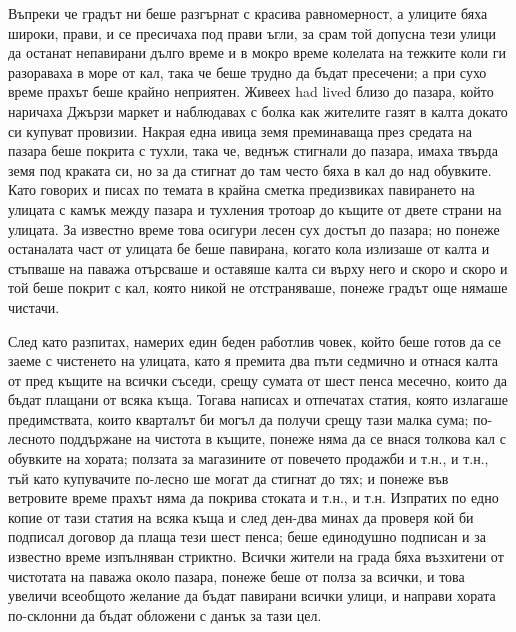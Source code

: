 \documentclass[12pt]{book}
\begin{document}
Въпреки че градът ни беше разгърнат с красива равномерност, а улиците бяха широки, прави, и се пресичаха под прави ъгли, за срам той допусна тези улици да останат непавирани дълго време и в мокро време колелата на тежките коли ги разораваха в море от кал, така че беше трудно да бъдат пресечени; а при сухо време прахът беше крайно неприятен. Живеех had lived близо до пазара, който наричаха Джързи маркет и наблюдавах с болка как жителите газят в калта докато си купуват провизии. Накрая една ивица земя преминаваща през средата на пазара беше покрита с тухли, така че, веднъж стигнали до пазара, имаха твърда земя под краката си, но за да стигнат до там често бяха в кал до над обувките. Като говорих и писах по темата в крайна сметка предизвиках павирането на улицата с камък между пазара и тухления тротоар до къщите от двете страни на улицата. За известно време това осигури лесен сух достъп до пазара; но понеже останалата част от улицата бе беше павирана, когато кола излизаше от калта и стъпваше на паважа отърсваше и оставяше калта си върху него и скоро и скоро и той беше покрит с кал, която никой не отстраняваше, понеже градът още нямаше чистачи. 

След като разпитах, намерих един беден работлив човек, който беше готов да се заеме с чистенето на улицата, като я премита два пъти седмично и отнася калта от пред къщите на всички съседи, срещу сумата от шест пенса месечно, които да бъдат плащани от всяка къща. Тогава написах и отпечатах статия, която излагаше предимствата, които кварталът би могъл да получи срещу тази малка сума; по-лесното поддържане на чистота в къщите, понеже няма да се внася толкова кал с обувките на хората; ползата за магазините от повечето продажби и т.н., и т.н., тъй като купувачите по-лесно ше могат да стигнат до тях; и понеже във ветровите време прахът няма да покрива стоката и т.н., и т.н. Изпратих по едно копие от тази статия на всяка къща и след ден-два минах да проверя кой би подписал договор да плаща тези шест пенса; беше единодушно подписан и за известно време изпълняван стриктно. Всички жители на града бяха възхитени от чистотата на паважа около пазара, понеже беше от полза за всички, и това увеличи всеобщото желание да бъдат павирани всички улици, и направи хората по-склонни да бъдат обложени с данък за тази цел. 
\end{document}

